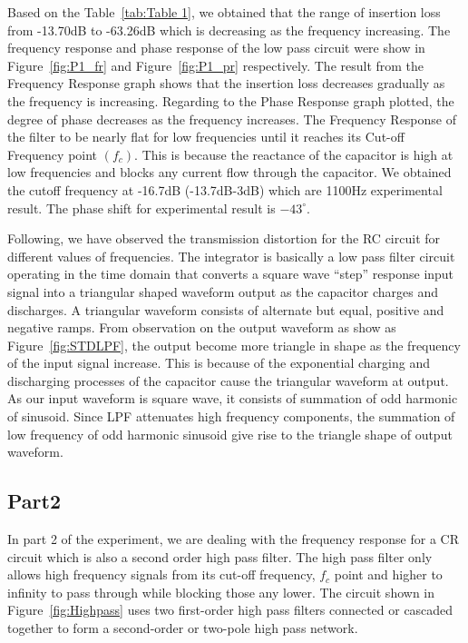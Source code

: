 \documentclass[a4paper, 12pt, english]{article}
\begin{document}
Based on the Table~\ref{tab:Table 1}, we obtained that the range of insertion
loss from -13.70dB to -63.26dB which is decreasing as the frequency increasing.
The frequency response and phase response of the low pass circuit were show in
Figure~\ref{fig:P1_fr} and Figure~\ref{fig:P1_pr} respectively. The result from
the Frequency Response graph shows that the insertion loss decreases gradually
as the frequency is increasing. Regarding to the Phase Response graph plotted,
the degree of phase decreases as the frequency increases. The Frequency
Response of the filter to be nearly flat for low frequencies until it reaches
its Cut-off Frequency point $(f_{c})$. This is because the reactance of the
capacitor is high at low frequencies and blocks any current flow through the
capacitor. We obtained the cutoff frequency at -16.7dB (-13.7dB-3dB) which are
1100Hz experimental result. The phase shift for experimental result is
$-43^{\circ}$. \newline

Following, we have observed the transmission distortion for the RC circuit for
different values of frequencies. The integrator is basically a low pass filter
circuit operating in the time domain that converts a square wave “step”
response input signal into a triangular shaped waveform output as the capacitor
charges and discharges. A triangular waveform consists of alternate but equal,
positive and negative ramps. From observation on the output waveform as show as
Figure~\ref{fig:STDLPF}, the output become more triangle in shape as the
frequency of the input signal increase. This is because of the exponential
charging and discharging processes of the capacitor cause the triangular
waveform at output. As our input waveform is square wave, it consists of
summation of odd harmonic of sinusoid. Since LPF attenuates high frequency
components, the summation of low frequency of odd harmonic sinusoid give rise
to the triangle shape of output waveform.

\subsection{Part2}
In part 2 of the experiment, we are dealing with the frequency response for a
CR circuit which is also a second order high pass filter. The high pass filter
only allows high frequency signals from its cut-off frequency, $f_{c}$ point
and higher to infinity to pass through while blocking those any lower. The
circuit shown in Figure~\ref{fig:Highpass} uses two first-order high pass
filters connected or cascaded together to form a second-order or two-pole high
pass network. \newline
\end{document}
